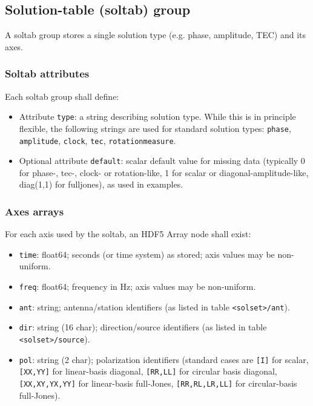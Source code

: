 \documentclass[a4paper,10pt,bibtotoc]{scrartcl}
\begin{document}
\subsection{Solution-table (soltab) group}
A soltab group stores a single solution type (e.g. phase, amplitude, TEC) and its axes.

\subsubsection*{Soltab attributes}
Each soltab group shall define:
\begin{itemize}
  \item Attribute \texttt{type}: a string describing solution type. While this is in principle flexible, the following strings are used for standard solution types: \texttt{phase}, \texttt{amplitude}, \texttt{clock}, \texttt{tec}, \texttt{rotationmeasure}.
  \item Optional attribute \texttt{default}: scalar default value for missing data (typically 0 for phase-, tec-, clock- or rotation-like, 1 for scalar or diagonal-amplitude-like, diag(1,1) for fulljones), as used in examples. 
\end{itemize}

\subsubsection*{Axes arrays}
For each axis used by the soltab, an HDF5 Array node shall exist:
\begin{itemize}
  \item \texttt{time}: float64; seconds (or time system) as stored; axis values may be non-uniform. 
  \item \texttt{freq}: float64; frequency in Hz; axis values may be non-uniform.
  \item \texttt{ant}: string; antenna/station identifiers (as listed in table \texttt{<solset>/ant}).
  \item \texttt{dir}: string (16 char); direction/source identifiers (as listed in table \texttt{<solset>/source}). 
  \item \texttt{pol}: string (2 char); polarization identifiers (standard cases are \texttt{[I]} for scalar, \texttt{[XX,YY]} for linear-basis diagonal, \texttt{[RR,LL]} for circular basis diagonal, \texttt{[XX,XY,YX,YY]} for linear-basis full-Jones, \texttt{[RR,RL,LR,LL]} for circular-basis full-Jones). \end{itemize}
\end{document}
